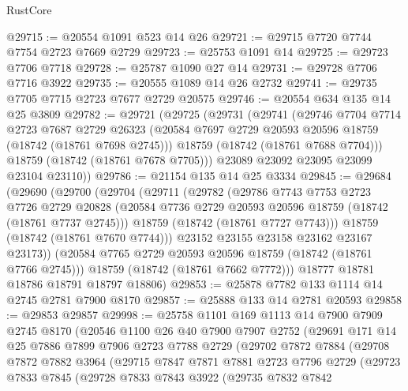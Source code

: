 \begin{lexlean}{RustCore}
\begin{coremodule}
@29715 := @20554 @1091 @523 @14 @26
@29721 := @29715 @7720 @7744 @7754 @2723 @7669 @2729
@29723 := @25753 @1091 @14
@29725 := @29723 @7706 @7718
@29728 := @25787 @1090 @27 @14
@29731 := @29728 @7706 @7716 @3922
@29735 := @20555 @1089 @14 @26 @2732
@29741 := @29735 @7705 @7715 @2723 @7677 @2729 @20575
@29746 := @20554 @634 @135 @14 @25 @3809
@29782 := @29721
    (@29725
      (@29731
        (@29741
          (@29746
            @7704
            @7714
            @2723
            @7687
            @2729
            @26323
            (@20584 @7697 @2729 @20593 @20596 @18759 (@18742 (@18761 @7698 @2745)))
            @18759
            (@18742 (@18761 @7688 @7704)))
          @18759
          (@18742 (@18761 @7678 @7705)))
        @23089
        @23092
        @23095
        @23099
        @23104
        @23110))
@29786 := @21154 @135 @14 @25 @3334
@29845 := @29684
    (@29690
      (@29700
        (@29704
          (@29711
            (@29782
              (@29786
                @7743
                @7753
                @2723
                @7726
                @2729
                @20828
                (@20584 @7736 @2729 @20593 @20596 @18759 (@18742 (@18761 @7737 @2745)))
                @18759
                (@18742 (@18761 @7727 @7743)))
              @18759
              (@18742 (@18761 @7670 @7744)))
            @23152
            @23155
            @23158
            @23162
            @23167
            @23173))
        (@20584 @7765 @2729 @20593 @20596 @18759 (@18742 (@18761 @7766 @2745)))
        @18759
        (@18742 (@18761 @7662 @7772)))
      @18777
      @18781
      @18786
      @18791
      @18797
      @18806)
@29853 := @25878 @7782 @133 @1114 @14 @2745 @2781 @7900 @8170
@29857 := @25888 @133 @14 @2781 @20593
@29858 := @29853 @29857
@29998 := @25758
    @1101
    @169
    @1113
    @14
    @7900
    @7909
    @2745
    @8170
    (@20546
      @1100
      @26
      @40
      @7900
      @7907
      @2752
      (@29691
        @171
        @14
        @25
        @7886
        @7899
        @7906
        @2723
        @7788
        @2729
        (@29702
          @7872
          @7884
          (@29708
            @7872
            @7882
            @3964
            (@29715
              @7847
              @7871
              @7881
              @2723
              @7796
              @2729
              (@29723
                @7833
                @7845
                (@29728
                  @7833
                  @7843
                  @3922
                  (@29735
                    @7832
                    @7842

\end{coremodule}
\end{lexlean}
